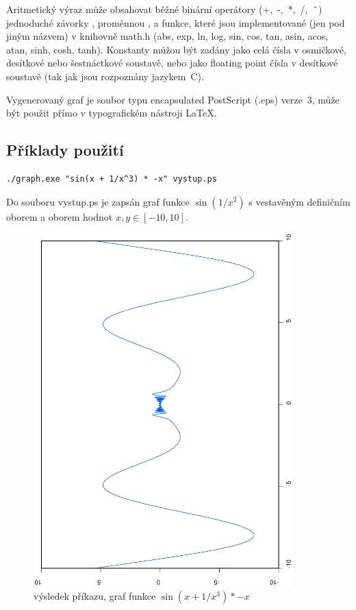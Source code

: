 \documentclass[11pt]{article}
\newcommand\CARET{\mathbin{\char`\^}}
\begin{document}
Aritmetický výraz může obsahovat běžné binární operátory (+,~-,~*,~/,~$\CARET$)
jednoduché závorky \uv{()}, proměnnou , a funkce, které jsou
implementované (jen pod jiným názvem) v knihovně math.h (abs, exp, ln, log,
sin, cos, tan, asin, acos, atan, sinh, cosh, tanh). Konstanty můžou být zadány
jako celá čísla v osmičkové, desítkové nebo šestnáctkové soustavě, nebo jako
floating point čísla v desítkové soustavě (tak jak jsou rozpoznány jazykem~C).

Vygenerovaný graf je soubor typu encapsulated PostScript (.eps) verze~3, může
být použit přímo v typografickém nástroji \LaTeX.

\subsection{Příklady použití}
\begin{verbatim}
./graph.exe "sin(x + 1/x^3) * -x" vystup.ps 
\end{verbatim}
Do souboru vystup.ps je zapsán graf funkce $\sin (1 / x^2)$
s vestavěným definičním oborem a oborem hodnot $x, y \in [-10, 10]$.
\begin{figure}[ht!]
\centering
	\includegraphics[width=10cm, angle=270]{figures/vystup1.eps}
	\caption{výsledek příkazu, graf funkce $\sin \left(x + 1/x^3 \right) * -x$}
\end{figure}
\clearpage
\end{document}
